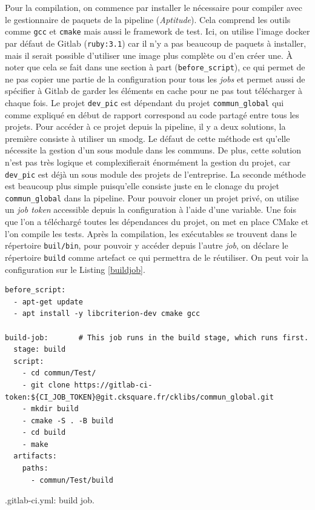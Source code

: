 \documentclass[a4paper]{article}
\begin{document}
Pour la compilation, on commence par installer le nécessaire pour compiler avec
le gestionnaire de paquets de la pipeline (\textit{Aptitude}). Cela comprend les
outils comme \verb|gcc| et \verb|cmake| mais aussi le framework de test. Ici, on
utilise l'image docker par défaut de Gitlab (\verb|ruby:3.1|) car il n'y a pas
beaucoup de paquets à installer, mais il serait possible d'utiliser une image
plus complète ou d'en créer une. À noter que cela se fait dans une section à
part (\verb|before_script|), ce qui permet de ne pas copier une partie de la
configuration pour tous les \textit{jobs} et permet aussi de spécifier à Gitlab
de garder les éléments en cache pour ne pas tout télécharger à chaque fois. Le
projet \verb|dev_pic| est dépendant du projet \verb|commun_global| qui comme
expliqué en début de rapport correspond au code partagé entre tous les projets.
Pour accéder à ce projet depuis la pipeline, il y a deux solutions, la première
consiste à utiliser un \gls{smodg}. Le défaut de cette méthode est qu'elle
nécessite la gestion d'un sous module dans les communs. De plus, cette solution
n'est pas très logique et complexifierait énormément la gestion du projet, car
\verb|dev_pic| est déjà un sous module des projets de l'entreprise. La seconde
méthode est beaucoup plus simple puisqu'elle consiste juste en le clonage du
projet \verb|commun_global| dans la pipeline. Pour pouvoir cloner un projet
privé, on utilise un \textit{job token} accessible depuis la configuration à
l'aide d'une variable. Une fois que l'on a téléchargé toutes les dépendances du
projet, on met en place CMake et l'on compile les tests. Après la compilation, les
exécutables se trouvent dans le répertoire \verb|buil/bin|, pour pouvoir y
accéder depuis l'autre \textit{job}, on déclare le répertoire \verb|build| comme
artefact ce qui permettra de le réutiliser. On peut voir la configuration sur le
Listing \ref{buildjob}.

\begin{listing}[ht!]
\begin{verbatim}
before_script:
  - apt-get update
  - apt install -y libcriterion-dev cmake gcc

build-job:       # This job runs in the build stage, which runs first.
  stage: build
  script:
    - cd commun/Test/
    - git clone https://gitlab-ci-token:${CI_JOB_TOKEN}@git.cksquare.fr/cklibs/commun_global.git
    - mkdir build
    - cmake -S . -B build
    - cd build
    - make
  artifacts:
    paths:
      - commun/Test/build
\end{verbatim}
\caption{.gitlab-ci.yml: build job.}
\label{buildjob}
\end{listing}
\end{document}
